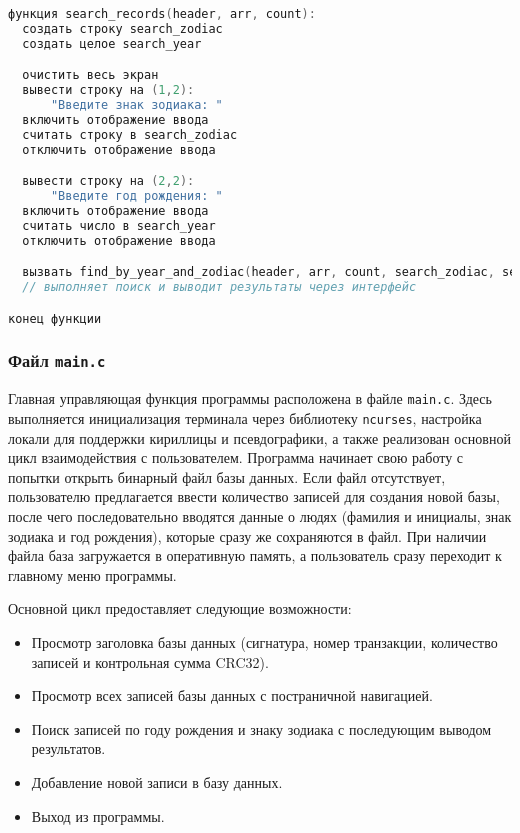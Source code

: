 \begin{lstlisting}[language=C, caption=Функция search\_records]
функция search_records(header, arr, count):
  создать строку search_zodiac
  создать целое search_year

  очистить весь экран
  вывести строку на (1,2):
      "Введите знак зодиака: "
  включить отображение ввода
  считать строку в search_zodiac
  отключить отображение ввода

  вывести строку на (2,2):
      "Введите год рождения: "
  включить отображение ввода
  считать число в search_year
  отключить отображение ввода

  вызвать find_by_year_and_zodiac(header, arr, count, search_zodiac, search_year)
  // выполняет поиск и выводит результаты через интерфейс

конец функции
\end{lstlisting}

\subsubsection*{Файл \texttt{main.c}}

Главная управляющая функция программы расположена в файле \texttt{main.c}. 
Здесь выполняется инициализация терминала через библиотеку \texttt{ncurses}, настройка локали для поддержки кириллицы и псевдографики, а также реализован основной цикл взаимодействия с пользователем. 
Программа начинает свою работу с попытки открыть бинарный файл базы данных. 
Если файл отсутствует, пользователю предлагается ввести количество записей для создания новой базы, после чего последовательно вводятся данные о людях (фамилия и инициалы, знак зодиака и год рождения), которые сразу же сохраняются в файл. 
При наличии файла база загружается в оперативную память, а пользователь сразу переходит к главному меню программы.

Основной цикл предоставляет следующие возможности:
\begin{itemize}
    \item Просмотр заголовка базы данных (сигнатура, номер транзакции, количество записей и контрольная сумма CRC32).
    \item Просмотр всех записей базы данных с постраничной навигацией.
    \item Поиск записей по году рождения и знаку зодиака с последующим выводом результатов.
    \item Добавление новой записи в базу данных.
    \item Выход из программы.
\end{itemize}

